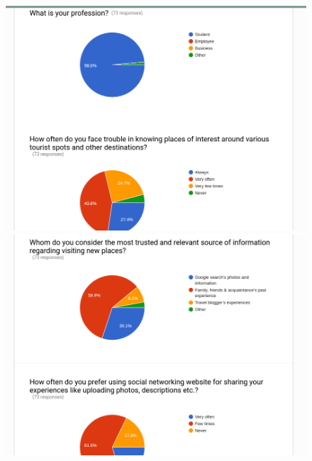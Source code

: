 \documentclass[]{article}
\begin{document}
\begin{figure}

  \includegraphics[width=\linewidth]{3.png}
 

  \includegraphics[width=\linewidth]{4.png}
  
 \end{figure}
\end{document}
